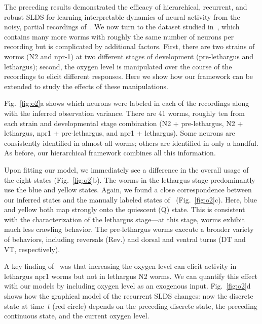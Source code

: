 \documentclass[11pt]{article}
\begin{document}
The preceding results demonstrated the efficacy of hierarchical,
recurrent, and robust SLDS for learning interpretable dynamics of
neural activity from the noisy, partial recordings
of~\citet{kato2015global}.  We now turn to the dataset studied
in~\citet{nichols2017global}, which contains many more worms with
roughly the same number of neurons per recording but is complicated by
additional factors.  First, there are two strains of worms (N2 and
npr-1) at two different stages of development (pre-lethargus and
lethargus); second, the oxygen level is manipulated over the course of
the recordings to elicit different responses.  Here we show how our
framework can be extended to study the effects of these manipulations.

Fig.~\ref{fig:o2}a shows which neurons were labeled in each of the
recordings along with the inferred observation variance. There are 41
worms, roughly ten from each strain and developmental stage
combination (N2 + pre-lethargus, N2 + lethargus, npr1 + pre-lethargus,
and npr1 + lethargus). Some neurons are consistently identified in
almost all worms; others are identified in only a handful.  As before,
our hierarchical framework combines all this information.

Upon fitting our model, we immediately see a difference in the overall
usage of the eight states (Fig.~\ref{fig:o2}b). The worms in the
lethargus stage predominantly use the blue and yellow states.  Again,
we found a close correspondence between our inferred states and the
manually labeled states of~\citet{nichols2017global}
(Fig.~\ref{fig:o2}c). Here, blue and yellow both map strongly onto the
quiescent (\textsf{Q}) state. This is consistent with the
characterization of the lethargus stage---at this stage, worms exhibit
much less crawling behavior. The pre-lethargus worms execute a broader
variety of behaviors, including reversals (\textsf{Rev.}) and dorsal
and ventral turns  (\textsf{DT} and \textsf{VT}, respectively). 

A key finding of~\citet{nichols2017global} was that increasing the
oxygen level can elicit activity in lethargus npr1 worms but not in
lethargus N2 worms. We can quantify this effect with our models by
including oxygen level as an exogenous input.  Fig.~\ref{fig:o2}d
shows how the graphical model of the recurrent SLDS changes: now the
discrete state at time~$t$ (red circle) depends on the preceding discrete
state, the preceding continuous state, and the current oxygen level.
\end{document}
